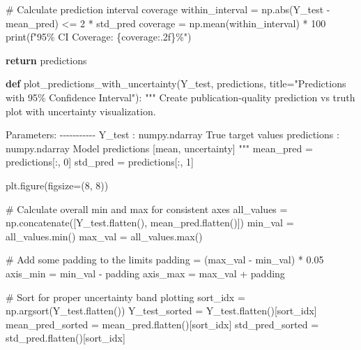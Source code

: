 \documentclass[
  letterpaper,
  DIV=11,
  numbers=noendperiod]{scrreprt}
\newenvironment{Shaded}{\begin{snugshade}}{\end{snugshade}}
\newcommand{\BuiltInTok}[1]{\textcolor[rgb]{0.00,0.23,0.31}{#1}}
\newcommand{\CommentTok}[1]{\textcolor[rgb]{0.37,0.37,0.37}{#1}}
\newcommand{\ControlFlowTok}[1]{\textcolor[rgb]{0.00,0.23,0.31}{\textbf{#1}}}
\newcommand{\DecValTok}[1]{\textcolor[rgb]{0.68,0.00,0.00}{#1}}
\newcommand{\FloatTok}[1]{\textcolor[rgb]{0.68,0.00,0.00}{#1}}
\newcommand{\KeywordTok}[1]{\textcolor[rgb]{0.00,0.23,0.31}{\textbf{#1}}}
\newcommand{\NormalTok}[1]{\textcolor[rgb]{0.00,0.23,0.31}{#1}}
\newcommand{\OperatorTok}[1]{\textcolor[rgb]{0.37,0.37,0.37}{#1}}
\newcommand{\SpecialCharTok}[1]{\textcolor[rgb]{0.37,0.37,0.37}{#1}}
\newcommand{\SpecialStringTok}[1]{\textcolor[rgb]{0.13,0.47,0.30}{#1}}
\newcommand{\StringTok}[1]{\textcolor[rgb]{0.13,0.47,0.30}{#1}}
\begin{document}
\begin{Shaded}
\begin{Highlighting}[]
    \CommentTok{\# Calculate prediction interval coverage}
\NormalTok{    within\_interval }\OperatorTok{=}\NormalTok{ np.}\BuiltInTok{abs}\NormalTok{(Y\_test }\OperatorTok{{-}}\NormalTok{ mean\_pred) }\OperatorTok{\textless{}=} \DecValTok{2} \OperatorTok{*}\NormalTok{ std\_pred}
\NormalTok{    coverage }\OperatorTok{=}\NormalTok{ np.mean(within\_interval) }\OperatorTok{*} \DecValTok{100}
    \BuiltInTok{print}\NormalTok{(}\SpecialStringTok{f"95\% CI Coverage: }\SpecialCharTok{\{}\NormalTok{coverage}\SpecialCharTok{:.2f\}}\SpecialStringTok{\%"}\NormalTok{)}

    \ControlFlowTok{return}\NormalTok{ predictions}

\KeywordTok{def}\NormalTok{ plot\_predictions\_with\_uncertainty(Y\_test, predictions, title}\OperatorTok{=}\StringTok{"Predictions with 95\% Confidence Interval"}\NormalTok{):}
    \CommentTok{"""}
\CommentTok{    Create publication{-}quality prediction vs truth plot with uncertainty visualization.}

\CommentTok{    Parameters:}
\CommentTok{    {-}{-}{-}{-}{-}{-}{-}{-}{-}{-}{-}}
\CommentTok{    Y\_test : numpy.ndarray}
\CommentTok{        True target values}
\CommentTok{    predictions : numpy.ndarray}
\CommentTok{        Model predictions [mean, uncertainty]}
\CommentTok{    """}
\NormalTok{    mean\_pred }\OperatorTok{=}\NormalTok{ predictions[:, }\DecValTok{0}\NormalTok{]}
\NormalTok{    std\_pred }\OperatorTok{=}\NormalTok{ predictions[:, }\DecValTok{1}\NormalTok{]}

\NormalTok{    plt.figure(figsize}\OperatorTok{=}\NormalTok{(}\DecValTok{8}\NormalTok{, }\DecValTok{8}\NormalTok{))}

    \CommentTok{\# Calculate overall min and max for consistent axes}
\NormalTok{    all\_values }\OperatorTok{=}\NormalTok{ np.concatenate([Y\_test.flatten(), mean\_pred.flatten()])}
\NormalTok{    min\_val }\OperatorTok{=}\NormalTok{ all\_values.}\BuiltInTok{min}\NormalTok{()}
\NormalTok{    max\_val }\OperatorTok{=}\NormalTok{ all\_values.}\BuiltInTok{max}\NormalTok{()}

    \CommentTok{\# Add some padding to the limits}
\NormalTok{    padding }\OperatorTok{=}\NormalTok{ (max\_val }\OperatorTok{{-}}\NormalTok{ min\_val) }\OperatorTok{*} \FloatTok{0.05}
\NormalTok{    axis\_min }\OperatorTok{=}\NormalTok{ min\_val }\OperatorTok{{-}}\NormalTok{ padding}
\NormalTok{    axis\_max }\OperatorTok{=}\NormalTok{ max\_val }\OperatorTok{+}\NormalTok{ padding}

    \CommentTok{\# Sort for proper uncertainty band plotting}
\NormalTok{    sort\_idx }\OperatorTok{=}\NormalTok{ np.argsort(Y\_test.flatten())}
\NormalTok{    Y\_test\_sorted }\OperatorTok{=}\NormalTok{ Y\_test.flatten()[sort\_idx]}
\NormalTok{    mean\_pred\_sorted }\OperatorTok{=}\NormalTok{ mean\_pred.flatten()[sort\_idx]}
\NormalTok{    std\_pred\_sorted }\OperatorTok{=}\NormalTok{ std\_pred.flatten()[sort\_idx]}


\end{Highlighting}
\end{Shaded}
\end{document}
